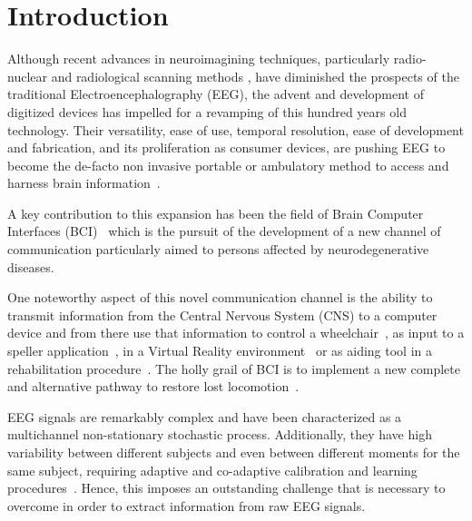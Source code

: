 \documentclass[utf8]{frontiersSCNS} %
\begin{document}
\section{Introduction}

Although recent advances in neuroimagining techniques, particularly radio-nuclear and radiological scanning methods \citep{Schomer2010}, have diminished the prospects of the traditional Electroencephalography (EEG), the advent and development of digitized devices has impelled for a revamping of this hundred years old technology.  Their versatility, ease of use, temporal resolution, ease of development and fabrication, and its proliferation as consumer devices, are pushing EEG to become the de-facto non invasive portable or ambulatory method to access and harness brain information~\citep{DeVos2014}.

A key contribution to this expansion has been the field of Brain Computer Interfaces (BCI)~\citep{WolpawJonathanR2012} which is the pursuit of the development of a new channel of communication particularly aimed to persons affected by neurodegenerative diseases.

One noteworthy aspect of this novel communication channel is the ability to transmit information from the Central Nervous System (CNS) to a computer device and from there use that information to control a wheelchair~\citep{Carlson2013}, as input to a speller application~\citep{Guger2009a}, in a Virtual Reality environment~\citep{Lotte2013} or as aiding tool in a rehabilitation procedure~\citep{Jure2016}.  The holly grail of BCI is to implement a new complete and alternative pathway to restore lost locomotion~\citep{WolpawJonathanR2012}.

EEG signals are remarkably complex and have been characterized as a multichannel non-stationary stochastic process.  Additionally, they have high variability between different subjects and even between different moments for the same subject, requiring adaptive and co-adaptive calibration and learning procedures~\citep{Clerc}.  Hence, this imposes an outstanding challenge that is necessary to overcome in order to extract information from raw EEG signals.

\end{document}
